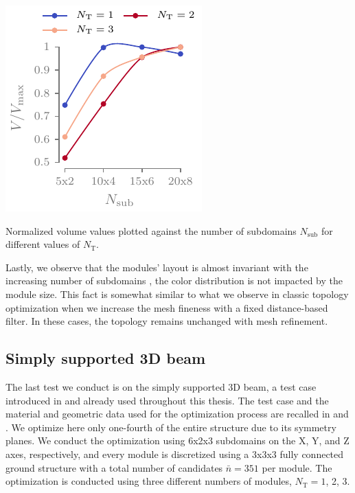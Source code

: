 \begin{marginfigure}
    \centering
    \includegraphics{figures/06_DMO/00_tug_bench_crv2/vol.pdf}
    \caption{Normalized volume values plotted against the number of subdomains $N_\text{sub}$ for different values of $N_\text{T}$.}
    \label{fig:06_cant_volume_norm_2}
\end{marginfigure}

Lastly, we observe that the modules' layout is almost invariant with the increasing number of subdomains \ie, the color distribution is not impacted by the module size. This fact is somewhat similar to what we observe in classic topology optimization when we increase the mesh fineness with a fixed distance-based filter. In these cases, the topology remains unchanged with mesh refinement.

\subsection{Simply supported 3D beam}
The last test we conduct is on the simply supported 3D beam, a test case introduced in  and already used throughout this thesis. The test case and the material and geometric data used for the optimization process are recalled in  and . We optimize here only one-fourth of the entire structure due to its symmetry planes. We conduct the optimization using 6x2x3 subdomains on the X, Y, and Z axes, respectively, and every module is discretized using a 3x3x3 fully connected ground structure with a total number of candidates $\bar{n} = 351$ per module. The optimization is conducted using three different numbers of modules, $N_\text{T}=1$, 2, 3.

